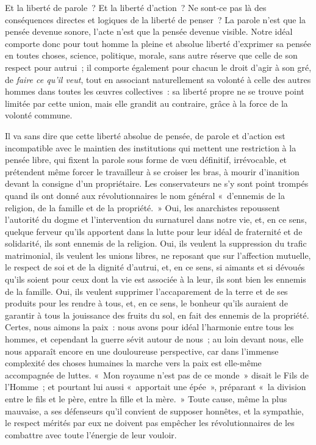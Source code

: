 \documentclass[french,twoside]{book} %
\newcommand\chapterclose{} %
\begin{document}
Et la liberté de parole ? Et la liberté d’action ? Ne sont-ce pas là des conséquences directes et logiques de la liberté de penser ? La parole n’est que la pensée devenue sonore, l’acte n’est que la pensée devenue visible. Notre idéal comporte donc pour tout homme la pleine et absolue liberté d’exprimer sa pensée en toutes choses, science, politique, morale, sans autre réserve que celle de son respect pour autrui ; il comporte également pour chacun le droit d’agir à son gré, de \emph{faire ce qu’il veut}, tout en associant naturellement sa volonté  à celle des autres hommes dans toutes les œuvres collectives : sa liberté propre ne se trouve point limitée par cette union, mais elle grandit au contraire, grâce à la force de la volonté commune.\par
Il va sans dire que cette liberté absolue de pensée, de parole et d’action est incompatible avec le maintien des institutions qui mettent une restriction à la pensée libre, qui fixent la parole sous forme de vœu définitif, irrévocable, et prétendent même forcer le travailleur à se croiser les bras, à mourir d’inanition devant la consigne d’un propriétaire. Les conservateurs ne s’y sont point trompés quand ils ont donné aux révolutionnaires le nom général « d’ennemis de la religion, de la famille et de la propriété. » Oui, les anarchistes repoussent  l’autorité du dogme et l’intervention du surnaturel dans notre vie, et, en ce sens, quelque ferveur qu’ils apportent dans la lutte pour leur idéal de fraternité et de solidarité, ils sont ennemis de la religion. Oui, ils veulent la suppression du trafic matrimonial, ils veulent les unions libres, ne reposant que sur l’affection mutuelle, le respect de soi et de la dignité d’autrui, et, en ce sens, si aimants et si dévoués qu’ils soient pour ceux dont la vie est associée à la leur, ils sont bien les ennemis de la famille. Oui, ils veulent supprimer l’accaparement de la terre et de ses produits pour les rendre à tous, et, en ce sens, le bonheur qu’ils auraient de garantir à tous la jouissance des fruits du sol, en fait des ennemis de la propriété.  Certes, nous aimons la paix : nous avons pour idéal l’harmonie entre tous les hommes, et cependant la guerre sévit autour de nous ; au loin devant nous, elle nous apparaît encore en une douloureuse perspective, car dans l’immense complexité des choses humaines la marche vers la paix est elle-même accompagnée de luttes. « Mon royaume n’est pas de ce monde » disait le Fils de l’Homme ; et pourtant lui aussi « apportait une épée », préparant « la division entre le fils et le père, entre la fille et la mère. » Toute cause, même la plus mauvaise, a ses défenseurs qu’il convient de supposer honnêtes, et la sympathie, le respect mérités par eux ne doivent pas empêcher les révolutionnaires de les combattre avec toute l’énergie de leur vouloir.
\chapterclose
\end{document}
